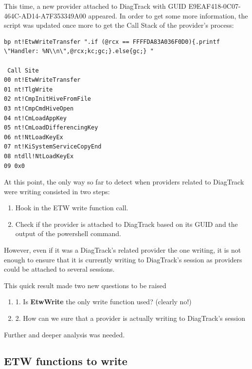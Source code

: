 This time, a new provider attached to DiagTrack with GUID E9EAF418-0C07-464C-AD14-A7F353349A00 appeared. In order to get some more information, the script was updated once more to get the Call Stack of the provider's process:
\begin{lstlisting}
bp nt!EtwWriteTransfer ".if (@rcx == FFFFDA83A036F0D0){.printf \"Handler: %N\\n\",@rcx;kc;gc;}.else{gc;} "
 
 Call Site
00 nt!EtwWriteTransfer
01 nt!TlgWrite
02 nt!CmpInitHiveFromFile
03 nt!CmpCmdHiveOpen
04 nt!CmLoadAppKey
05 nt!CmLoadDifferencingKey
06 nt!NtLoadKeyEx
07 nt!KiSystemServiceCopyEnd
08 ntdll!NtLoadKeyEx
09 0x0
\end{lstlisting}

At this point, the only way so far to detect when providers related to DiagTrack were writing consisted in two steps: 
\begin{enumerate}
\setlength\itemsep{0.05em}
\item Hook in the ETW write function call.
\item Check if the provider is attached to DiagTrack based on its GUID and the output of the powershell command.
\end{enumerate}

However, even if it was a DiagTrack's related provider the one writing, it is not enough to ensure that it is currently writing to DiagTrack's session as providers could be attached to several sessions.

This quick result made two new questions to be raised
\begin{enumerate}
\setlength\itemsep{0.05em}
  \item 1. Is {\bfseries EtwWrite} the only write function used? (clearly no!)
  \item 2. How can we sure that a provider is actually writing to DiagTrack's session
\end{enumerate}

Further and deeper analysis was needed.





\subsection{\bfseries{ETW functions to write}}

